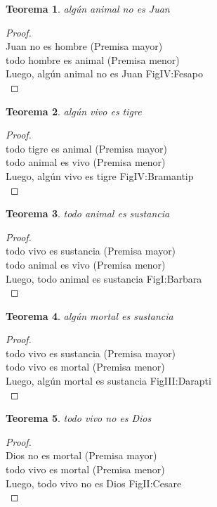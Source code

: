 ﻿\documentclass[12pt]{book}
\newtheorem{theorem}{Teorema}[chapter]
\newtheorem{proof}{Demostración}
\begin{document}
\begin{theorem}
algún animal no es Juan
\label{th: 22}
\end{theorem}\begin{proof}\\Juan no es hombre	 (Premisa mayor) \\todo hombre es animal	 (Premisa menor) \\Luego, algún animal no es Juan	FigIV:Fesapo \\ \end{proof}
\begin{theorem}
algún vivo es tigre
\label{th: 23}
\end{theorem}\begin{proof}\\todo tigre es animal	 (Premisa mayor) \\todo animal es vivo	 (Premisa menor) \\Luego, algún vivo es tigre	FigIV:Bramantip \\ \end{proof}
\begin{theorem}
todo animal es sustancia
\label{th: 24}
\end{theorem}\begin{proof}\\todo vivo es sustancia	 (Premisa mayor) \\todo animal es vivo	 (Premisa menor) \\Luego, todo animal es sustancia	FigI:Barbara \\ \end{proof}
\begin{theorem}
algún mortal es sustancia
\label{th: 25}
\end{theorem}\begin{proof}\\todo vivo es sustancia	 (Premisa mayor) \\todo vivo es mortal	 (Premisa menor) \\Luego, algún mortal es sustancia	FigIII:Darapti \\ \end{proof}
\begin{theorem}
todo vivo no es Dios
\label{th: 26}
\end{theorem}\begin{proof}\\Dios no es mortal	 (Premisa mayor) \\todo vivo es mortal	 (Premisa menor) \\Luego, todo vivo no es Dios	FigII:Cesare \\ \end{proof}
\end{document}
